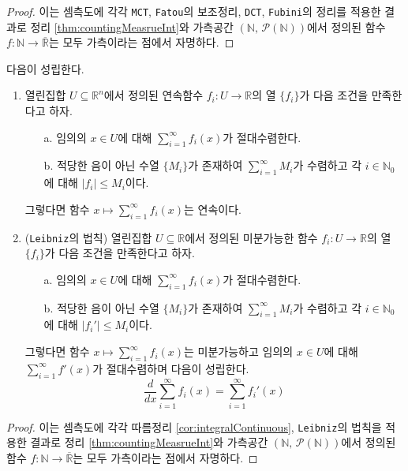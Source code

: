 \begin{proof}
    이는 셈측도에 각각 \texttt{MCT}, \texttt{Fatou}의 보조정리, \texttt{DCT}, \texttt{Fubini}의 정리를 적용한 결과로 정리 \ref{thm:countingMeasrueInt}와 가측공간 $(\mathbb{N},\,\mathcal{P}(\mathbb{N}))$에서 정의된 함수 $f:\mathbb{N}\to\overline{\mathbb{R}}$는 모두 가측이라는 점에서 자명하다.
\end{proof}

\begin{corollary}
    다음이 성립한다.
    \begin{enumerate}
        \item 열린집합 $U\subseteq\mathbb{R}^n$에서 정의된 연속함수 $f_i:U\to\mathbb{R}$의 열 $\{f_i\}$가 다음 조건을 만족한다고 하자.
        \begin{enumerate}
            \item[a.] 임의의 $x\in U$에 대해 $\sum_{i=1}^\infty f_i(x)$가 절대수렴한다.
            \item[b.] 적당한 음이 아닌 수열 $\{M_i\}$가 존재하여 $\sum_{i=1}^\infty M_i$가 수렴하고 각 $i\in\mathbb{N}_0$에 대해 $|f_i|\leq M_i$이다.
        \end{enumerate}
        그렇다면 함수 $x\mapsto\sum_{i=1}^\infty f_i(x)$는 연속이다.
        \item (\texttt{Leibniz}의 법칙) 열린집합 $U\subseteq\mathbb{R}$에서 정의된 미분가능한 함수 $f_i:U\to\mathbb{R}$의 열 $\{f_i\}$가 다음 조건을 만족한다고 하자.
        \begin{enumerate}
            \item[a.] 임의의 $x\in U$에 대해 $\sum_{i=1}^\infty f_i(x)$가 절대수렴한다.
            \item[b.] 적당한 음이 아닌 수열 $\{M_i\}$가 존재하여 $\sum_{i=1}^\infty M_i$가 수렴하고 각 $i\in\mathbb{N}_0$에 대해 $|f_i'|\leq M_i$이다.
        \end{enumerate}
        그렇다면 함수 $x\mapsto\sum_{i=1}^\infty f_i(x)$는 미분가능하고 임의의 $x\in U$에 대해 $\sum_{i=1}^\infty f'(x)$가 절대수렴하며 다음이 성립한다.
        \begin{equation*}
            \frac{d}{dx}\sum_{i=1}^\infty f_i(x)=\sum_{i=1}^\infty f_i'(x)
        \end{equation*}
    \end{enumerate}
\end{corollary}

\begin{proof}
    이는 셈측도에 각각 따름정리 \ref{cor:integralContinuous}, \texttt{Leibniz}의 법칙을 적용한 결과로 정리 \ref{thm:countingMeasrueInt}와 가측공간 $(\mathbb{N},\,\mathcal{P}(\mathbb{N}))$에서 정의된 함수 $f:\mathbb{N}\to\overline{\mathbb{R}}$는 모두 가측이라는 점에서 자명하다.
\end{proof}

